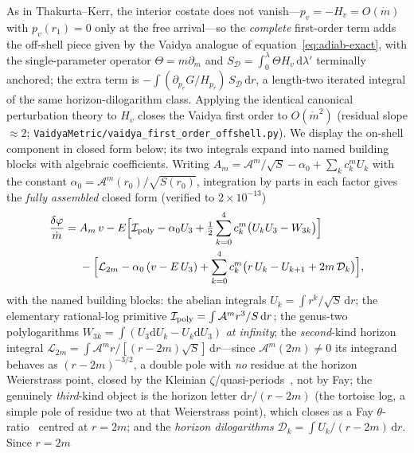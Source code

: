 \documentclass[12pt]{iopart}
\newcommand{\dd}{\mathrm{d}}
\begin{document}
As in Thakurta--Kerr, the interior costate does not
vanish---$p_v=-H_v=O(\dot m)$ with $p_v(r_1)=0$ only at the free arrival---so the
\emph{complete} first-order term adds the off-shell piece given by the Vaidya analogue
of equation~\eqref{eq:adiab-exact}, with the single-parameter operator $\Theta=m\partial_m$
and $S_{\mathcal D}=\int_0^\lambda\Theta H_v\,\dd\lambda'$ terminally anchored; the extra term is
$-\!\int(\partial_{p_r}G/H_{p_r})\,S_{\mathcal D}\,\dd r$, a length-two iterated integral of the
same horizon-dilogarithm class. Applying the identical canonical perturbation theory
to $H_v$ closes the Vaidya first order to $O(\dot m^2)$ (residual slope $\approx2$;
\texttt{VaidyaMetric/vaidya\_first\_order\_offshell.py}). We display the on-shell
component in closed form below;
its two integrals expand into named building blocks with algebraic coefficients.
Writing $A_m=\mathcal{A}^m/\sqrt S-\alpha_0+\sum_k c_k^m U_k$ with the constant
$\alpha_0=\mathcal{A}^m(r_0)/\sqrt{S(r_0)}$, integration by parts in each factor gives
the \emph{fully assembled} closed form (verified to $2\times10^{-13}$)
\begin{equation}
\begin{aligned}
    \frac{\delta\varphi}{\dot m}
    ={}&A_m\,v
    -E\Big[\mathcal{I}_{\rm poly}-\alpha_0 U_3
        +\tfrac12\sum_{k=0}^4 c_k^m\big(U_kU_3-W_{3k}\big)\Big]\\
    &{}-\Big[\mathcal{L}_{2m}-\alpha_0\,(v-E\,U_3)
        +\sum_{k=0}^4 c_k^m\big(r\,U_k-U_{k+1}+2m\,\mathcal{D}_k\big)\Big],
\end{aligned}
    \label{eq:vaidya-full}
\end{equation}
with the named building blocks: the abelian integrals $U_k=\int r^k/\sqrt S\,\dd r$;
the elementary rational-log primitive
$\mathcal{I}_{\rm poly}=\int\mathcal{A}^m r^3/S\,\dd r$; the genus-two
polylogarithms $W_{3k}=\int(U_3\dd U_k-U_k\dd U_3)$ \emph{at infinity};
the \emph{second}-kind horizon integral
$\mathcal{L}_{2m}=\int\mathcal{A}^m r/[(r-2m)\sqrt S]\,\dd r$---since
$\mathcal{A}^m(2m)\ne0$ its integrand behaves as $(r-2m)^{-3/2}$, a double pole with
\emph{no} residue at the horizon Weierstrass point, closed by the Kleinian
$\zeta$/quasi-periods~\cite{BuchstaberEnolskii1997,BakerAbelian1897}, not by Fay; the
genuinely \emph{third}-kind object is the horizon letter $\dd r/(r-2m)$ (the tortoise
log, a simple pole of residue two at that Weierstrass point), which closes as a Fay
$\theta$-ratio~\cite{Fay1973} centred at $r=2m$; and
the \emph{horizon dilogarithms} $\mathcal{D}_k=\int U_k/(r-2m)\,\dd r$. Since $r=2m$
\end{document}

